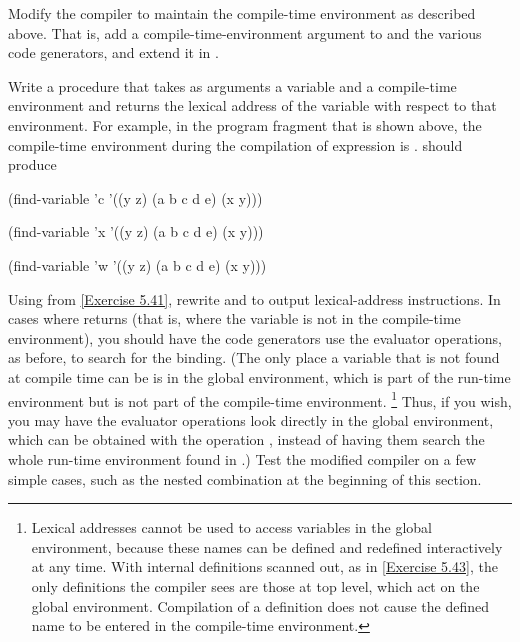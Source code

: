 \begin{exercise}
	\label{Exercise 5.40}
	Modify the compiler to maintain the compile-time environment as described above.
	That is, add a compile-time-environment argument to  and the various code generators, and extend it in .
\end{exercise}



\begin{exercise}
	\label{Exercise 5.41}
	Write a procedure  that takes as arguments a variable and a compile-time environment and returns the lexical address of the variable with respect to that environment.
	For example, in the program fragment that is shown above, the compile-time environment during the compilation of expression  is .
	 should produce

	\begin{scheme}
	  (find-variable 'c '((y z) (a b c d e) (x y)))
	  ~~

	  (find-variable 'x '((y z) (a b c d e) (x y)))
	  ~~

	  (find-variable 'w '((y z) (a b c d e) (x y)))
	  ~~
	\end{scheme}
\end{exercise}



\begin{exercise}
	\label{Exercise 5.42}
	Using  from \cref{Exercise 5.41}, rewrite  and  to output lexical-address instructions.
	In cases where  returns  (that is, where the variable is not in the compile-time environment), you should have the code generators use the evaluator operations, as before, to search for the binding.
	(The only place a variable that is not found at compile time can be is in the global environment, which is part of the run-time environment but is not part of the compile-time environment.%
	\footnote{
		Lexical addresses cannot be used to access variables in the global environment, because these names can be defined and redefined interactively at any time.
		With internal definitions scanned out, as in \cref{Exercise 5.43}, the only definitions the compiler sees are those at top level, which act on the global environment.
		Compilation of a definition does not cause the defined name to be entered in the compile-time environment.
	}
	Thus, if you wish, you may have the evaluator operations look directly in the global environment, which can be obtained with the operation , instead of having them search the whole run-time environment found in .)
	Test the modified compiler on a few simple cases, such as the nested  combination at the beginning of this section.
\end{exercise}



